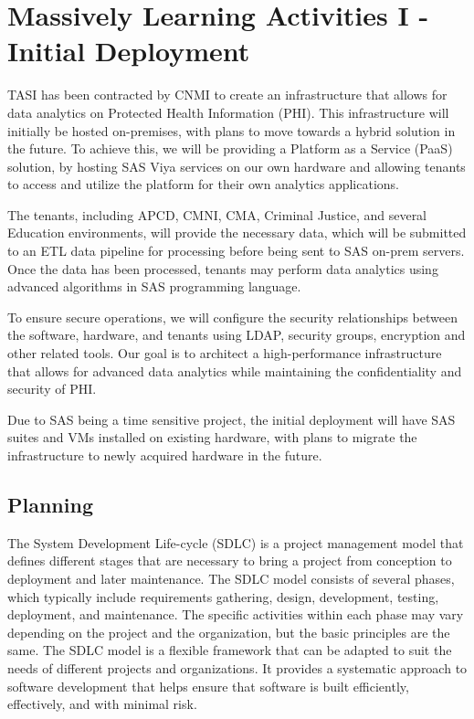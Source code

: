 \section{Massively Learning Activities I - Initial Deployment} \label{section: MLA}
TASI has been contracted by CNMI to create an infrastructure that allows for data analytics on Protected Health Information (PHI). This infrastructure will initially be hosted on-premises, with plans to move towards a hybrid solution in the future. To achieve this, we will be providing a Platform as a Service (PaaS) solution, by hosting SAS Viya services on our own hardware and allowing tenants to access and utilize the platform for their own analytics applications.

The tenants, including APCD, CMNI, CMA, Criminal Justice, and several Education environments, will provide the necessary data, which will be submitted to an ETL data pipeline for processing before being sent to SAS on-prem servers. Once the data has been processed, tenants may perform data analytics using advanced algorithms in SAS programming language.

To ensure secure operations, we will configure the security relationships between the software, hardware, and tenants using LDAP, security groups, encryption  and other related tools. Our goal is to architect a high-performance infrastructure that allows for advanced data analytics while maintaining the confidentiality and security of PHI.

Due to SAS being a time sensitive project, the initial deployment will have SAS suites and VMs installed on existing hardware, with plans to migrate the infrastructure to newly acquired hardware in the future.

\subsection{Planning}

The System Development Life-cycle (SDLC) is a project management model that defines different stages that are necessary to bring a project from conception to deployment and later maintenance. The SDLC model consists of several phases, which typically include requirements gathering, design, development, testing, deployment, and maintenance. The specific activities within each phase may vary depending on the project and the organization, but the basic principles are the same. The SDLC model is a flexible framework that can be adapted to suit the needs of different projects and organizations. It provides a systematic approach to software development that helps ensure that software is built efficiently, effectively, and with minimal risk.

